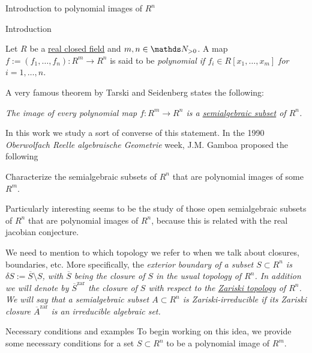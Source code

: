 \documentclass[11pt, a4paper, english, twoside, notitlepage, openright]{report}
\begin{document}
\tableofcontents
\thispagestyle{empty}

\begin{chapter}{Introduction to polynomial images of $R^n$}

\begin{section}{Introduction}
\begin{definition}\label{polyMap} Let $R$ be a \hyperref[realCField]{real closed field} and $m,n\in\N_{>0}$. A map $f:=(f_1,\dots,f_n):R^m\to R^n$ is said to be \em polynomial \em if $f_i\in R[x_1,\dots,x_m]$ for $i=1,\dots,n$. 
\end{definition}
	
A very famous theorem by Tarski and Seidenberg states the following:
\begin{theorem}\label{tarskiSeidenberg} \em The image of every polynomial map $f: R^m \longrightarrow R^n$ is a \hyperref[semialgSet]{semialgebraic subset} of $R^n$. \em
\end{theorem}

In this work we study a sort of converse of this statement. In the 1990 \emph{Oberwolfach Reelle algebraische Geometrie} week, J.M. Gamboa \cite{g} proposed the following
\begin{problem}
Characterize the semialgebraic subsets of $R^n$ that are polynomial images of some $R^m$.
\end{problem}
Particularly interesting seems to be the study of those open semialgebraic subsets of $R^n$ that are polynomial images of $R^n$, because this is related with the real jacobian conjecture.
	
\begin{notation} We need to mention to which topology we refer to when we talk about closures, boundaries, etc. More specifically, the \em exterior boundary \em of a subset $S\subset R^n$ is $\delta S:=\overline{S}\setminus S$, with $\overline{S}$ being the \em closure \em of $S$ in the usual topology of $R^n$. In addition we will denote by $\overline{S}^{\text{zar}}$ the closure of $S$ with respect to the \hyperref[zariski]{Zariski topology} of $R^n$. We will say that a semialgebraic subset $A\subset R^n$ is \em Zariski-irreducible \em if its Zariski closure $\overline{A}^{\text{zar}}$ is an irreducible algebraic set.
\end{notation}
	
\begin{subsection}{Necessary conditions and examples} To begin working on this idea, we provide some necessary conditions for a set $S\subset R^n$ to be a polynomial image of $R^m$. 
	

\end{subsection}
\end{section}
\end{chapter}
\end{document}
